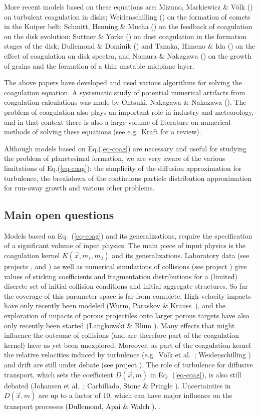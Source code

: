 More recent models based on these equations are: Mizuno, Markiewicz \&
V\"olk () on turbulent coagulation in disks; Weidenschilling
() on the formation of comets in the Kuiper belt; Schmitt, Henning
\& Mucha () on the feedback of coagulation on the disk evolution;
Suttner \& Yorke () on dust coagulation in the formation stages of
the disk; Dullemond \& Dominik () and Tanaka, Himeno \& Ida
() on the effect of coagulation on disk spectra, and Nomura \&
Nakagawa () on the growth of grains and the formation of a
thin unstable midplane layer.

The above papers have developed and used various algorithms for solving the
coagulation equation. A systematic study of potential numerical artifacts
from coagulation calculations was made by Ohtsuki, Nakagawa \& Nakazawa
(). The problem of coagulation also plays an important role in
industry and meteorology, and in that context there is also a large volume
of literature on numerical methods of solving these equations (see
e.g.~Kraft  for a review).

Although models based on Eq.(\ref{eq-coag}) are necessary and useful for
studying the problem of planetesimal formation, we are very aware of the
various limitations of Eq.(\ref{eq-coag}): the simplicity of the diffusion
approximation for turbulence, the breakdown of the continuous particle
distribution approximation for run-away growth and various other problems.


\subsection{Main open questions}
Models based on Eq.~(\ref{eq-coag}) and its generalizations, require the
specification of a significant volume of input physics. The main piece of
input physics is the coagulation kernel $K(\vec x,m_1,m_2)$ and its
generalizations. Laboratory data (see projects
\projblum{}, \projwurm{} and \projblumtrie{}) as well as numerical
simulations of collisions (see project \projkley{}) give values of sticking
coefficients and fragmentation distributions for a (limited) discrete set of
initial collision conditions and initial aggregate structures. So far the
coverage of this parameter space is far from complete. High velocity impacts
have only recently been modeled (Wurm, Paraskov \& Krauss~), and
the exploration of impacts of porous projectiles onto larger porous targets
have also only recently been started (Langkowski \& Blum ). Many effects that might influence the outcome of collisions (and
are therefore part of the coagulation kernel) have as yet been
unexplored. Moreover, as part of the coagulation kernel the relative
velocities induced by turbulence (e.g.~V\"olk et al.~;
Weidenschilling ) and drift are still under debate (see project
\projklahr{}). The role of turbulence for diffusive transport, which sets
the coefficient $D(\vec x,m)$ in Eq.~(\ref{eq-coag}), is also still debated
(Johansen et al.~; Carbillado, Stone \& Pringle
). Uncertainties in $D(\vec x,m)$ are up to a factor of 10, which
can have major influence on the transport processes (Dullemond, Apai \&
Walch ).  .

